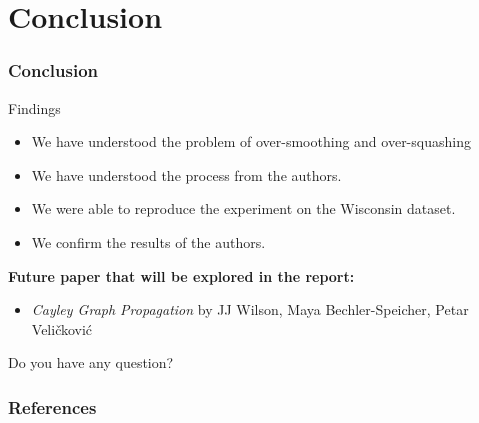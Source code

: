 \documentclass[10pt, aspectratio = 169]{beamer}
\begin{document}
\section{Conclusion}
\begin{frame}
    \frametitle{Conclusion}
    \begin{block}{Findings}
        \begin{itemize}
            \item We have understood the problem of over-smoothing and over-squashing
            \item We have understood the process from the authors.
            \item We were able to reproduce the experiment on the Wisconsin dataset.
            \item We confirm the results of the authors.
        \end{itemize}
    \end{block}
    \textbf{Future paper that will be explored in the report:}
    \begin{itemize}
        \item \textit{Cayley Graph Propagation} by JJ Wilson, Maya 
        Bechler-Speicher, Petar Veličković \cite{wilson2024cayleygraphpropagation}
    \end{itemize}

    \begin{block}{Do you have any question?}
        
    \end{block}
\end{frame}

\begin{frame}[allowframebreaks]
    \frametitle{References}
    \scriptsize
    
    

\end{frame}
\end{document}
